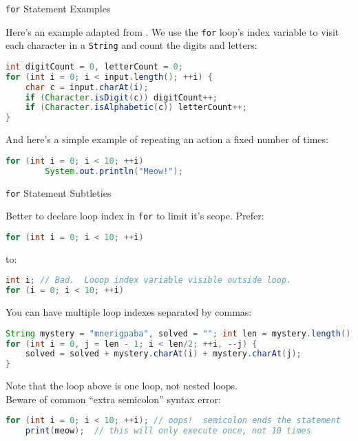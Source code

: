 \documentclass{beamer}
\begin{document}
\begin{frame}[fragile]{{\tt for} Statement Examples}


Here's an example adapted from  .  We use the {\tt for} loop's index variable to visit each character in a {\tt String} and count the digits and letters:
\begin{lstlisting}[language=Java]
int digitCount = 0, letterCount = 0;
for (int i = 0; i < input.length(); ++i) {
    char c = input.charAt(i);
    if (Character.isDigit(c)) digitCount++;
    if (Character.isAlphabetic(c)) letterCount++;
}
\end{lstlisting}

And here's a simple example of repeating an action a fixed number of times:
\begin{lstlisting}[language=Java]
for (int i = 0; i < 10; ++i)
        System.out.println("Meow!");
\end{lstlisting}



\end{frame}

\begin{frame}[fragile]{{\tt for} Statement Subtleties}


Better to declare loop index in {\tt for} to limit it's scope.  Prefer:
\vspace{-.05in}
\begin{lstlisting}[language=Java]
for (int i = 0; i < 10; ++i)
\end{lstlisting}
\vspace{-.1in}
to:
\vspace{-.05in}
\begin{lstlisting}[language=Java]
int i; // Bad.  Looop index variable visible outside loop.
for (i = 0; i < 10; ++i)
\end{lstlisting}

You can have multiple loop indexes separated by commas:
\vspace{-.05in}
\begin{lstlisting}[language=Java]
String mystery = "mnerigpaba", solved = ""; int len = mystery.length();
for (int i = 0, j = len - 1; i < len/2; ++i, --j) {
    solved = solved + mystery.charAt(i) + mystery.charAt(j);
}
\end{lstlisting}

Note that the loop above is one loop, not nested loops.\\
\vspace{.025in}
Beware of common ``extra semicolon'' syntax error:
\vspace{-.05in}
\begin{lstlisting}[language=Java]
for (int i = 0; i < 10; ++i); // oops!  semicolon ends the statement
    print(meow);  // this will only execute once, not 10 times
\end{lstlisting}

\end{frame}
\end{document}
